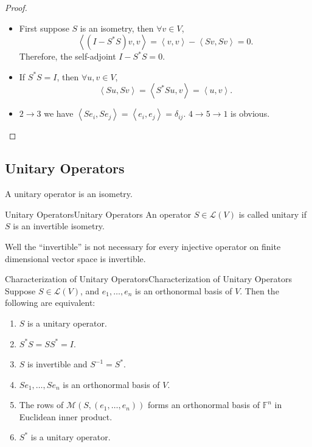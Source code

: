 \documentclass[../main.tex]{subfiles}
\begin{document}
\begin{proof}
\begin{itemize}
\item First suppose $S$ is an isometry, then $\forall v\in V$,
	\begin{equation*}
	\left<(I-S^*S)v,v\right> = \left<v,v\right> - \left<Sv,Sv\right> =0.
	\end{equation*}
	Therefore, the self-adjoint $I-S^*S=0$.
\item If $S^*S=I$, then $\forall u,v\in V$,
	\begin{equation*}
	\left<Su,Sv\right> = \left<S^*Su,v\right> = \left<u,v\right>.
	\end{equation*}
\item $2 \rightarrow 3$ we have $\left<Se_i,Se_j\right> = \left<e_i,e_j\right> = \delta_{ij}$. $4 \rightarrow 5 \rightarrow 1$ is obvious.
\end{itemize}
\end{proof}

\subsection{Unitary Operators}
A unitary operator is an isometry.
\begin{definition}{Unitary Operators}{Unitary Operators}
An operator $S\in \mathscr{L}(V)$ is called unitary if $S$ is an invertible isometry.
\end{definition}

Well the ``invertible'' is not necessary for every injective operator on finite dimensional vector space is invertible.

\begin{theorem}{Characterization of Unitary Operators}{Characterization of Unitary Operators}
Suppose $S\in \mathscr{L}(V)$, and $e_1, \ldots ,e_n$ is an orthonormal basis of $V$. Then the following are equivalent:
\begin{enumerate}
	\item $S$ is a unitary operator.
	\item $S^*S=SS^*=I$.
	\item $S$ is invertible and $S^{-1}=S^*$.
	\item $Se_1, \ldots ,Se_n$ is an orthonormal basis of $V$.
	\item The rows of $\mathscr{M}(S,(e_1, \ldots ,e_n))$ forms an orthonormal basis of $\mathbb{F}^n$ in Euclidean inner product.
	\item $S^*$ is a unitary operator.
\end{enumerate}
\end{theorem}
\end{document}
